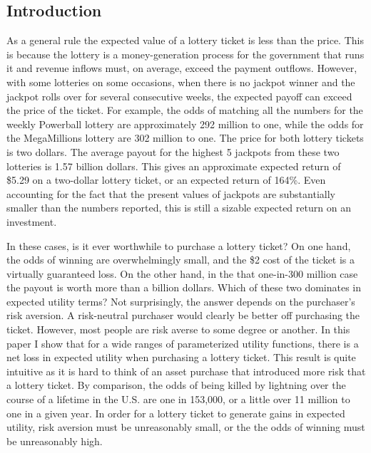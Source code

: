 \documentclass[letterpaper,12pt]{article}
\numberwithin{equation}{section}
\numberwithin{figure}{section}
\numberwithin{table}{section}
\begin{document}
\begin{spacing}{1.5}

\section{Introduction} \label{sec_intro}

	As a general rule the expected value of a lottery ticket is less than the price.  This is because the lottery is a money-generation process for the government that runs it and revenue inflows must, on average, exceed the payment outflows.  However, with some lotteries on some occasions, when there is no jackpot winner and the jackpot rolls over for several consecutive weeks, the expected payoff can exceed the price of the ticket.  For example, the odds of matching all the numbers for the weekly Powerball lottery are approximately 292 million to one, while the odds for the MegaMillions lottery are 302 million to one.  The price for both lottery tickets is two dollars.  The average payout for the highest 5 jackpots from these two lotteries is 1.57 billion dollars.  This gives an approximate expected return of \$5.29 on a two-dollar lottery ticket, or an expected return of 164\%.  Even accounting for the fact that the present values of jackpots are substantially smaller than the numbers reported, this is still a sizable expected return on an investment.

	In these cases, is it ever worthwhile to purchase a lottery ticket?  On one hand, the odds of winning are overwhelmingly small, and the \$2 cost of the ticket is a virtually guaranteed loss.  On the other hand, in the that one-in-300 million case the payout is worth more than a billion dollars.  Which of these two dominates in expected utility terms?  Not surprisingly, the answer depends on the purchaser's risk aversion.  A risk-neutral purchaser would clearly be better off purchasing the ticket.  However, most people are risk averse to some degree or another.  In this paper I show that for a wide ranges of parameterized utility functions, there is a net loss in expected utility when purchasing a lottery ticket.  This result is quite intuitive as it is hard to think of an asset purchase that introduced more risk that a lottery ticket.  By comparison, the odds of being killed by lightning over the course of a lifetime in the U.S. are one in 153,000, or a little over 11 million to one in a given year.  In order for a lottery ticket to generate gains in expected utility, risk aversion must be unreasonably small, or the the odds of winning must be unreasonably high.


\end{spacing}
\end{document}
